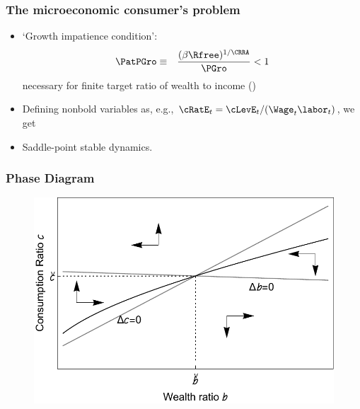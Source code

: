 \documentclass{beamer}
\begin{document}
\begin{frame}
\frametitle{The microeconomic consumer's problem}
    \begin{itemize}
    \item `Growth impatience condition':
\begin{eqnarray*}
\PatPGro & \equiv & \frac{(\beta \Rfree)^{1/\CRRA}}{\PGro} <1
\end{eqnarray*}
necessary for finite target ratio of wealth to income (\cite{BufferStockTheory})
    \item Defining nonbold variables as, e.g., $\cRatE_{t}=\cLevE_{t}/(\Wage_{t}\labor_{t})$, we get



    \item Saddle-point stable dynamics. 
    \end{itemize}

\end{frame}

\begin{frame}
\frametitle{Phase Diagram}
    \begin{figure}
    \centering
    \includegraphics[width=.65\textwidth]{../figures/phaseDiag.pdf}
    \end{figure}
\end{frame}

\end{document}
